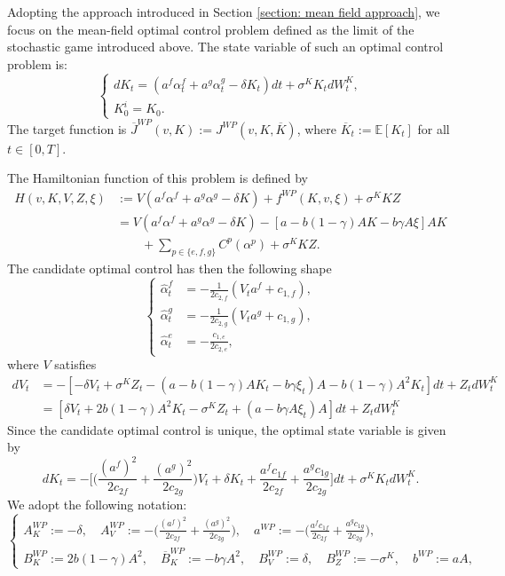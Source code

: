 \documentclass[11pt,twoside]{amsart}
\theoremstyle{definition}
\numberwithin{equation}{section}
\newcommand{\E}{\mathbb{E}}
\renewcommand{\bar}{\overline}
\renewcommand{\hat}{\widehat}
\begin{document}
Adopting the approach introduced in Section \ref{section: mean field approach}, we focus on the mean-field optimal control problem defined as the limit of the stochastic game introduced above. The state variable of such an optimal control problem is: 
\begin{equation*}
\begin{cases}
dK_t = (a^f\alpha^f_t + a^g\alpha^g_t - \delta K_t)dt + \sigma^K K_t dW^K_t,\\
K^i_0 = K_0.
\end{cases}
\end{equation*}
The target function is $\bar{J}^{WP}(v, K):= J^{WP}(v, K,\bar{K})$, where $\bar{K}_t:= \E[K_t]$ for all $t\in[0,T]$.

The Hamiltonian function of this problem is defined by 
\begin{align*}
    H(v, K, V, Z, \xi) &:= V(a^f\alpha^f + a^g \alpha^g - \delta K) + f^{WP}(K, v, \xi) + \sigma^KK Z\\
    &=V(a^f\alpha^f+a^g\alpha^g - \delta K)  -[a-b(1-\gamma)AK - b\gamma A\xi]AK \\
    &\qquad+ \sum_{p \in \{e,f,g\}}C^p(\alpha^p)+\sigma^KKZ.
\end{align*}
The candidate optimal control has then the following shape
\begin{equation*}
    \begin{cases}
        \hat\alpha^f_t &= -\frac{1}{2c_{2,f}}(V_ta^f + c_{1,f}),\\
        \hat\alpha^g_t &= -\frac{1}{2c_{2,g}}(V_ta^g + c_{1,g}),\\
        \hat\alpha^e_t &= -\frac{c_{1,e}}{2c_{2,e}},
    \end{cases}
\end{equation*}
where $V$ satisfies
\begin{align*}
    dV_t &= -[-\delta V_t + \sigma^KZ_t - (a-b(1-\gamma)AK_t - b\gamma\xi_t)A - b(1-\gamma)A^2K_t]dt + Z_tdW^K_t\\
    &=[\delta V_t + 2b(1-\gamma)A^2K_t - \sigma^KZ_t + (a-b\gamma A\xi_t)A]dt + Z_tdW^K_t
\end{align*}
Since the candidate optimal control is unique, the optimal state variable is given by 
\begin{equation*}
dK_t = -\bigg[ 
\bigg(\frac{(a^f)^2}{2c_{2f}}+\frac{(a^g)^2}{2c_{2g}}\bigg)V_t + \delta K_t + \frac{a^fc_{1f}}{2c_{2f}}+\frac{a^gc_{1g}}{2c_{2g}}\bigg]dt + \sigma^KK_t dW^K_t.
\end{equation*}
We adopt the following notation:
\begin{equation*}
\begin{cases} 
    A^{WP}_K := -\delta, \quad A^{WP}_V := -\bigg(\frac{(a^f)^2}{2c_{2f}}+\frac{(a^g)^2}{2c_{2g}}\bigg), \quad a^{WP} := -\bigg( \frac{a^fc_{1f}}{2c_{2f}}+\frac{a^gc_{1g}}{2c_{2g}}\bigg),\\
    B^{WP}_K := 2b(1-\gamma)A^2,\quad \bar{B}^{WP}_K:= -b\gamma A^2,\quad B^{WP}_V:= \delta, \quad B^{WP}_Z := - \sigma^K, \quad b^{WP} := aA,
\end{cases}
\end{equation*}
\end{document}
